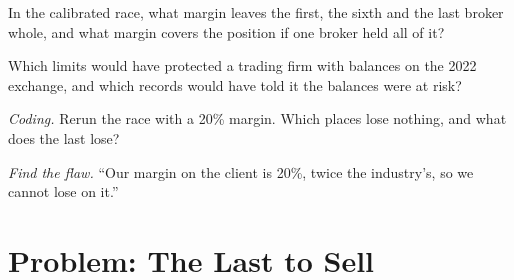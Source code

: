 \begin{exercise}[$\star\star$]\label{exo:fm:case-studies-ii:5}
In the calibrated race, what margin leaves the first, the sixth and the last broker whole, and what margin covers the position if one broker held
all of it?
\end{exercise}

\begin{exercise}[$\star\star$]\label{exo:fm:case-studies-ii:6}
Which limits would have protected a trading firm with balances on the 2022 exchange, and which records would have told it the balances were at risk?
\end{exercise}

\begin{exercise}[$\star\star\star$]\label{exo:fm:case-studies-ii:7}
\emph{Coding.} Rerun the race with a 20\% margin. Which places lose nothing, and what does the last lose?
\end{exercise}

\begin{exercise}[$\star\star\star$]\label{exo:fm:case-studies-ii:8}
\emph{Find the flaw.} ``Our margin on the client is 20\%, twice the industry's, so we cannot lose on it.''
\end{exercise}

\section{Problem: The Last to Sell}

